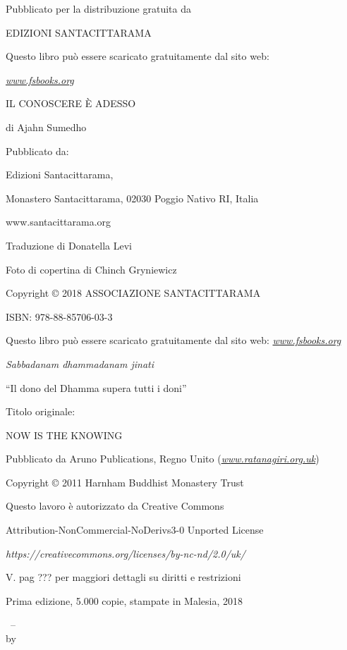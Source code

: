 \cleartoverso
\thispagestyle{empty}

{\copyrightsize
\centering
\setlength{\parindent}{0pt}%
\setlength{\parskip}{0.8\baselineskip}%


Pubblicato per la distribuzione gratuita da

EDIZIONI SANTACITTARAMA

Questo libro può essere scaricato gratuitamente dal sito web:

\href{http://www.forestsangha.org/}{\emph{www.fsbooks.org}}

IL CONOSCERE È ADESSO

di Ajahn Sumedho

Pubblicato da:

Edizioni Santacittarama,

Monastero Santacittarama, 02030 Poggio Nativo RI, Italia

www.santacittarama.org

Traduzione di Donatella Levi

Foto di copertina di Chinch Gryniewicz

Copyright © 2018 ASSOCIAZIONE SANTACITTARAMA

ISBN: 978-88-85706-03-3

Questo libro può essere scaricato gratuitamente dal sito web:
\href{http://www.forestsangha.org/}{\emph{\emph{www.fsbooks.org}}}

\emph{Sabbadanam dhammadanam jinati}

``Il dono del Dhamma supera tutti i doni''

Titolo originale:

NOW IS THE KNOWING

Pubblicato da Aruno Publications, Regno Unito
(\href{http://www.ratanagiri.org.uk/}{\emph{www.ratanagiri.org.uk}})

Copyright © 2011 Harnham Buddhist Monastery Trust

Questo lavoro è autorizzato da Creative Commons

Attribution-NonCommercial-NoDerivs3-0 Unported License

\emph{https://creativecommons.org/licenses/by-nc-nd/2.0/uk/}

V. pag ??? per maggiori dettagli su diritti e restrizioni

Prima edizione, 5.000 copie, stampate in Malesia, 2018


\thetitle\ -- \thesubtitle\\
by \theauthor

}
